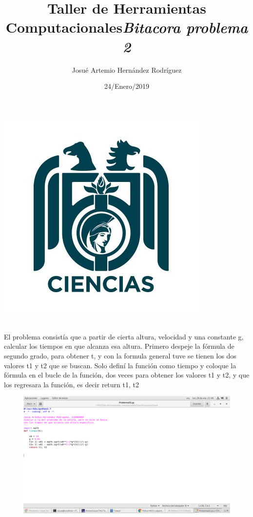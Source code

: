 \label{key}\documentclass[letterpaper, 12pt,oneside]{article}
\title{\Huge Taller de Herramientas Computacionales}
\author{Josué Artemio Hernández Rodríguez}
\date{24/Enero/2019}
\begin{document}
	\maketitle
	\begin{center}
		\includegraphics[scale=0.7]{3.jpg}
	\end{center}

	\newpage
	
	\title{\huge \textit{Bitacora problema 2 }}\\
	
	El problema consistía que a partir de cierta altura, velocidad y una constante g, calcular los tiempos en que alcanza esa altura. Primero despeje la fórmula de segundo grado, para obtener t, y con la formula general tuve se tienen los dos valores t1 y t2 que se buscan. Solo definí la función como tiempo y coloque la fórmula en el bucle de la función, dos veces para obtener los valores t1 y t2, y que los regresara la función, es decir return t1, t2

	\begin{figure}[h]
		\includegraphics[scale=0.3]{pro02.png}
	\end{figure}
	
	
	
	
	
	
	
	
	
	
	
\end{document}
